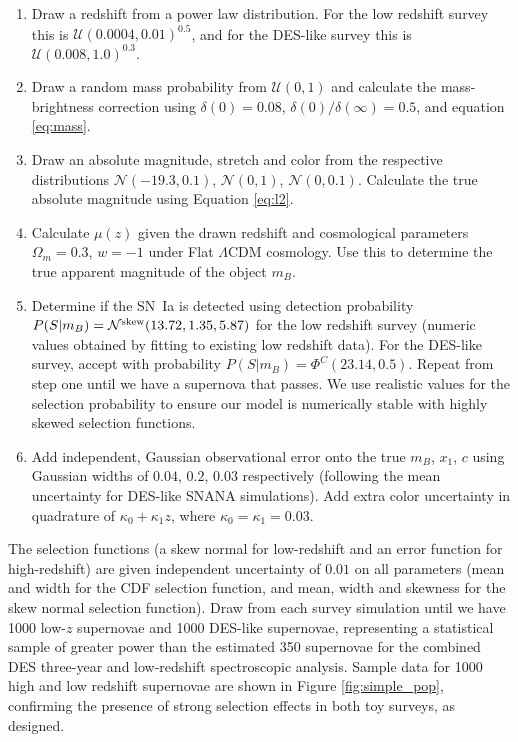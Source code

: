 \documentclass[a4paper,fleqn,usenatbib]{mnras}
\newcommand{\green}{\color{forestgreen}}
\begin{document}
\begin{enumerate}[1.]
	\item Draw a redshift from a power law distribution. For the low redshift survey this is $\mathcal{U}(0.0004, 0.01)^{0.5}$, and for the DES-like survey this is $\mathcal{U}(0.008, 1.0)^{0.3}$.
	\item Draw a random mass probability from $\mathcal{U}(0, 1)$ and calculate the mass-brightness correction using $\delta(0) = 0.08$, $\delta(0)/\delta(\infty) = 0.5$, and equation \eqref{eq:mass}.
	\item Draw an absolute magnitude, stretch and color from the respective distributions $\mathcal{N}(-19.3, 0.1)$, $\mathcal{N}(0, 1)$, $\mathcal{N}(0, 0.1)$. {\green Calculate the true absolute magnitude using Equation \eqref{eq:l2}.}
	\item Calculate $\mu(z)$ given the drawn redshift and cosmological parameters $\Omega_m = 0.3$, $w = -1$ under Flat $\Lambda$CDM cosmology. Use this to determine the true apparent magnitude of the object $m_B$.
	\item Determine if the SN~Ia is detected using detection probability $P(S|m_B) = \mathcal{N}^{\rm skew}(13.72, 1.35, 5.87)$ for the low redshift survey (numeric values obtained by fitting to existing low redshift data). For the DES-like survey, accept with probability $P(S|m_B) = \Phi^C(23.14, 0.5)$. Repeat from step one until we have a supernova that passes. {\green We use realistic values for the selection probability to ensure our model is numerically stable with highly skewed selection functions.}
	\item Add independent, Gaussian observational error onto the true $m_B$, $x_1$, $c$ using Gaussian widths of $0.04$, $0.2$, $0.03$ respectively (following the mean uncertainty for DES-like SNANA simulations). Add extra color uncertainty in quadrature of $\kappa_0 + \kappa_1 z$, where $\kappa_0 = \kappa_1 = 0.03$.
\end{enumerate}

The selection functions (a skew normal for low-redshift and an error function for high-redshift) are given independent uncertainty of $0.01$ on all parameters (mean and width for the CDF selection function, and mean, width and skewness for the skew normal selection function). Draw from each survey simulation until we have 1000 low-$z$ supernovae and 1000 DES-like supernovae, representing a statistical sample of greater power than the estimated 350 supernovae for the combined DES three-year and low-redshift spectroscopic analysis. Sample data for 1000 high and low redshift supernovae are shown in Figure \ref{fig:simple_pop}, confirming the presence of strong selection effects in both toy surveys, as designed. 
\end{document}

